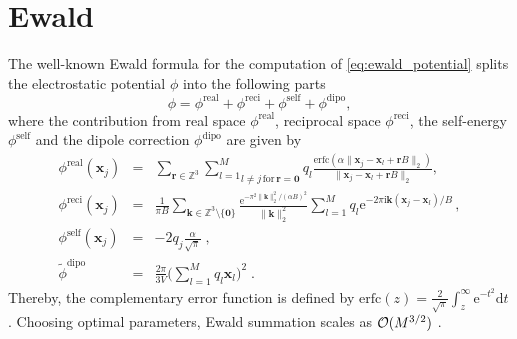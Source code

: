 \chapter{Ewald}
\label{cha:ewald}



The well-known Ewald formula for the computation of \eqref{eq:ewald_potential} splits the
electrostatic potential $\phi$ into the following parts
\begin{equation}\label{eq:ewald}
 \phi = \phi^{\text{real}} + \phi^{\text{reci}}  + \phi^{\text{self}}  + \phi^{\text{dipo}},
\end{equation}
where the contribution from real space $ \phi^{\text{real}}$, reciprocal space $\phi^{\text{reci}}$,
the self-energy $\phi^{\text{self}}$ and the dipole correction $\phi^{\text{dipo}}$ are given by
\begin{eqnarray}
  \phi^{\text{real}}(\mathbf x_j)
  &=& \nonumber
    \sum_{\mathbf r\in \mathbb Z^3}
    \underset{ l\neq j \,{\text{for}}\, \mathbf r= \mathbf 0}{\sum_{l=1}^M}
    q_l\frac{{\text{erfc}}(\alpha \|\mathbf x_j -\mathbf x_l +\mathbf r B\|_2)}{\|\mathbf x_j -\mathbf x_l +\mathbf r B\|_2},\\
  \phi^{\text{reci}}(\mathbf x_j)
  &=& \label{eq:ewald_reci}
    \frac{1}{\pi B} \sum_{\mathbf k\in \mathbb Z^3\setminus\{\mathbf 0\}}
    \frac{{\text{e}}^{-\pi^2 \|\mathbf k\|_2^2/(\alpha B)^2}}{\|\mathbf k\|_2^2}
    \sum_{l=1}^M q_l {\text{e}}^{-2\pi \text{i} \mathbf k (\mathbf x_j -\mathbf x_l)/B}\, ,\\
  \phi^{\text{self}} (\mathbf x_j)
  &=&
    -2 q_j \frac{\alpha}{\sqrt{\pi}}\; ,\nonumber  \\
  \widetilde\phi^{\text{dipo}}
  &=&
    \frac{2\pi}{3V}\bigg(\sum_{l=1}^Mq_{l}\mathbf x_{l}\bigg)^{2}\; .\nonumber %
\end{eqnarray}
Thereby, the complementary error function is defined by $\textrm{erfc}(z) =
\frac{2}{\sqrt{\pi}}\int_z^\infty \text{e}^{-t^2} \text{d}t$.
Choosing optimal parameters, Ewald summation scales as ${\cal O}(M^{3/2})$ \cite{kolafa92a}.
